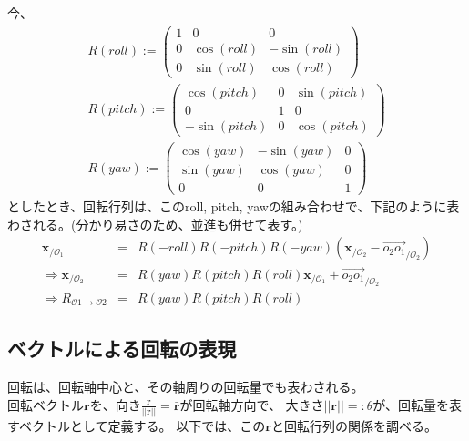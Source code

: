 \documentclass[10pt]{jarticle}
\begin{document}
今、
\begin{eqnarray}
    R(roll):=\left(
      \begin{array}{ccc}
          1&0&0\\
          0&\cos(roll)&-\sin(roll)\\
          0&\sin(roll)&\cos(roll)
      \end{array}
      \right)\\
    R(pitch):=\left(
      \begin{array}{ccc}
          \cos(pitch)&0&\sin(pitch)\\
          0&1&0\\
          -\sin(pitch)&0&\cos(pitch)
      \end{array}
      \right)\\
    R(yaw):=\left(
      \begin{array}{ccc}
          \cos(yaw)&-\sin(yaw)&0\\
          \sin(yaw)&\cos(yaw)&0\\
          0&0&1
      \end{array}
    \right)
\end{eqnarray}
としたとき、回転行列は、このroll, pitch, yawの組み合わせで、下記のように表わされる。(分かり易さのため、並進も併せて表す。)
\begin{eqnarray}
\boldsymbol x_{/\mathcal{O}_1} &=& R(-roll) R(-pitch) R(-yaw) (\boldsymbol x_{/\mathcal O_2} - \overrightarrow{o_2 o_1}_{/\mathcal O_2})\\
\Rightarrow
\boldsymbol x_{/\mathcal{O}_2} &=& R(yaw) R(pitch) R(roll) \boldsymbol x_{/\mathcal O_1} + \overrightarrow{o_2 o_1}_{/\mathcal O_2}\\
\Rightarrow
R_{\mathcal O1\rightarrow \mathcal O2} &=& R(yaw) R(pitch) R(roll)
\end{eqnarray}


\subsection{ベクトルによる回転の表現}
回転は、回転軸中心と、その軸周りの回転量でも表わされる。\\
回転ベクトル$\boldsymbol{r}$を、向き$\frac{\boldsymbol{r}}{||\boldsymbol{r}||}=\boldsymbol{\bar{r}}$が回転軸方向で、
大きさ$||\boldsymbol{r}||=:\theta$が、回転量を表すベクトルとして定義する。
以下では、この$\boldsymbol{r}$と回転行列の関係を調べる。
\end{document}
